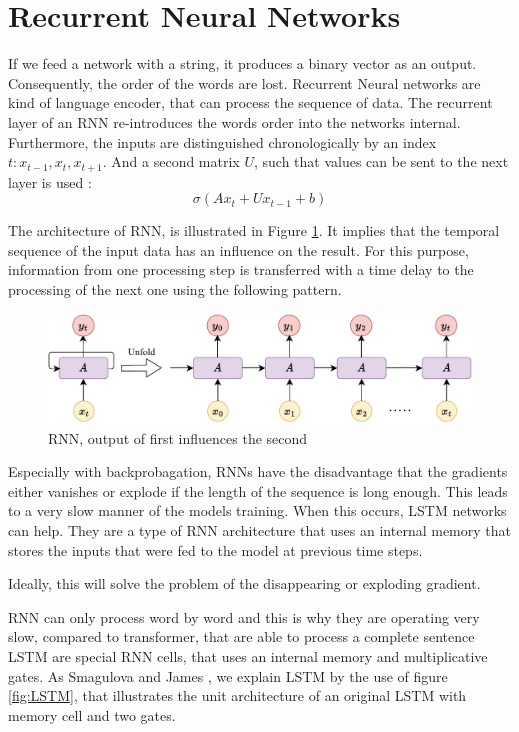 \section{Recurrent Neural Networks}\label{RnnLstm}
If we feed a network with a string, it produces a binary vector as an output.
Consequently, the order of the words are lost.
Recurrent Neural networks are kind of language encoder, that can process the sequence of data.
The recurrent layer of an \ac{RNN} re-introduces the words order into the networks internal.
Furthermore, the inputs are distinguished chronologically by an index $t: x_{t-1},x_t, x_{t+1}$.
And a second matrix $U$, such that values can be sent to the next layer is used \cite{haralambous_course_2024}:
\begin{equation}
    \sigma(Ax_t+Ux_{t-1}+b)
\end{equation}

The architecture of \ac{RNN}, is illustrated in Figure \ref{fig:RNN}.
It implies that the temporal sequence of the input data has an influence on the result.
For this purpose, information from one processing step is transferred with a time delay to the processing of the next one using the following pattern.

\begin{figure}[h]
   \centering
   \includegraphics[width=0.8\linewidth]{Abschlussarbeit/Pictures/RNN.drawio.pdf}
   \caption{\ac{RNN}, output of first influences the second \cite{BiLSTM}}
   \label{fig:RNN}
\end{figure}

Especially with backprobagation, \ac{RNN}s have the disadvantage that the gradients either vanishes or explode if the length of the sequence is long enough.
This leads to a very slow manner of the models training.
When this occurs, \ac{LSTM} networks can help. 
They are a type of \ac{RNN} architecture that uses an internal memory that stores the inputs that were fed to the model at previous time steps.

Ideally, this will solve the problem of the disappearing or exploding gradient.

\ac{RNN} can only process word by word and this is why they are operating very slow, compared to transformer, that are able to process a complete sentence 
\ac{LSTM} \cite{originalLSTM_book} are special \ac{RNN} cells, that uses an internal memory and multiplicative gates.
As Smagulova and James \cite{LSTM}, we explain \ac{LSTM} by the use of figure \ref{fig:LSTM}, that illustrates the unit architecture of an original \ac{LSTM} with memory cell and two gates. 

